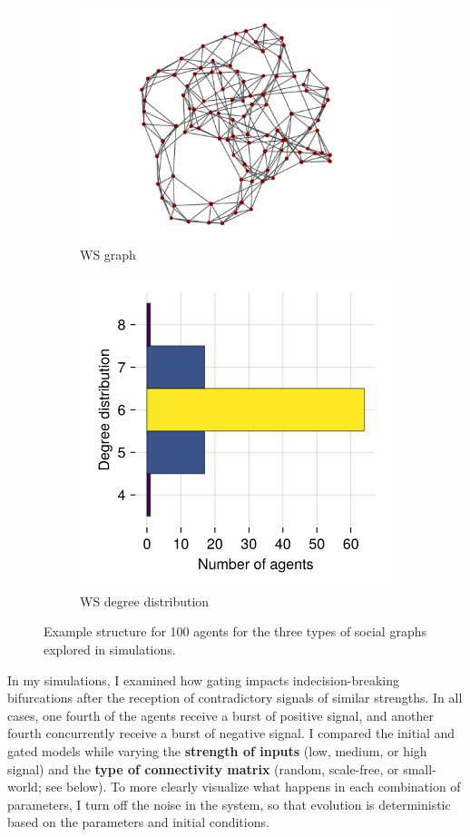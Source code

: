 \documentclass[]{article}
\begin{document}
\begin{figure}
	\begin{subfigure}{0.45\textwidth}
		\centering
		\includegraphics[width=0.8\linewidth]{../plots/g_wattsstrogatz_n100_k3_p01_s33} 
		\caption{WS graph}  \label{fig:subim31}
	\end{subfigure}
	\hspace{-1cm}
	\begin{subfigure}{0.45\textwidth}
		\centering
		\includegraphics[width=0.5\linewidth]{../plots/g_wattsstrogatz_hist_degree_n100_k3_p01_s33}
		\caption{WS degree distribution} \label{fig:subim32}
	\end{subfigure}
	
	\caption{Example structure for 100 agents for the three types of social graphs explored in simulations.}
	\label{fig:graphtypes}
\end{figure}

In my simulations, I examined how gating impacts indecision-breaking bifurcations after the reception of contradictory signals of similar strengths. In all cases, one fourth of the agents receive a burst of positive signal, and another fourth concurrently receive a burst of negative signal. I compared the initial and gated models while varying the \textbf{strength of inputs} (low, medium, or high signal) and the \textbf{type of connectivity matrix} (random, scale-free, or small-world; see below). To more clearly visualize what happens in each combination of parameters, I turn off the noise in the system, so that evolution is deterministic based on the parameters and initial conditions.
\end{document}
